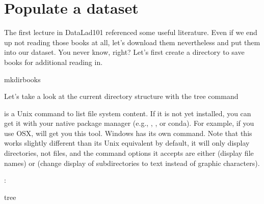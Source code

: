 \sphinxstepscope

\ignorespaces 

\section{Populate a dataset}
\label{\detokenize{basics/101-102-populate:populate-a-dataset}}\label{\detokenize{basics/101-102-populate:populate}}\label{\detokenize{basics/101-102-populate:index-0}}\label{\detokenize{basics/101-102-populate::doc}}
\sphinxAtStartPar
The first lecture in DataLad\sphinxhyphen{}101 referenced some useful literature.
Even if we end up not reading those books at all, let’s download
them nevertheless and put them into our dataset. You never know, right?
Let’s first create a directory to save books for additional reading in.

\begin{sphinxVerbatim}[commandchars=\\\{\}]
mkdirbooks
\end{sphinxVerbatim}

\ignorespaces 
\sphinxAtStartPar
Let’s take a look at the current directory structure with the tree command%
\begin{footnote}\sphinxAtStartFootnote
{} is a Unix command to list file system content. If it is not yet installed,
you can get it with your native package manager (e.g.,  , , or conda).
For example, if you use OSX,   will get you this tool.
Windows has its own  command.
Note that this  works slightly different than its Unix equivalent \sphinxhyphen{} by default, it will only display directories, not files, and the command options it accepts are either  (display file names) or  (change display of subdirectories to text instead of graphic characters).
%
\end{footnote}:

\begin{sphinxVerbatim}[commandchars=\\\{\}]
tree

\end{sphinxVerbatim}

